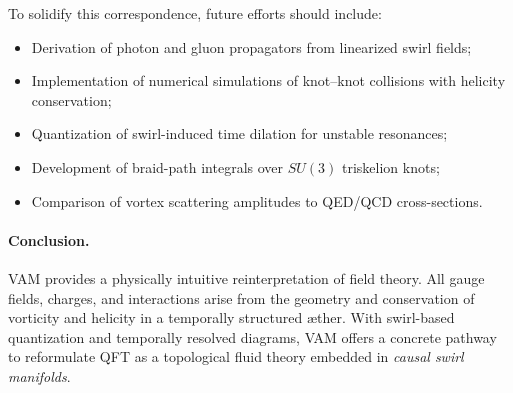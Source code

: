 To solidify this correspondence, future efforts should include:

\begin{itemize}
    \item Derivation of photon and gluon propagators from linearized swirl fields;
    \item Implementation of numerical simulations of knot–knot collisions with helicity conservation;
    \item Quantization of swirl-induced time dilation for unstable resonances;
    \item Development of braid-path integrals over \( SU(3) \) triskelion knots;
    \item Comparison of vortex scattering amplitudes to QED/QCD cross-sections.
\end{itemize}

\paragraph{Conclusion.} VAM provides a physically intuitive reinterpretation of field theory. All gauge fields, charges, and interactions arise from the geometry and conservation of vorticity and helicity in a temporally structured æther. With swirl-based quantization and temporally resolved diagrams, VAM offers a concrete pathway to reformulate QFT as a topological fluid theory embedded in \textit{causal swirl manifolds}.
